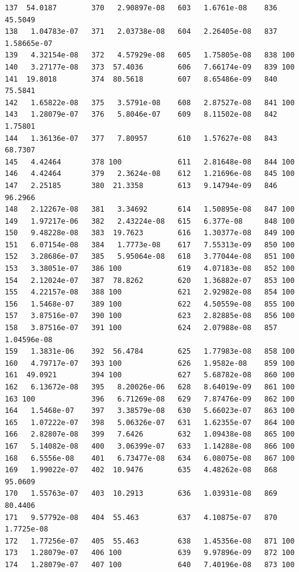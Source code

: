\documentclass{article}
\begin{document}
\begin{verbatim}
137  54.0187        370   2.90897e-08   603   1.6761e-08    836  45.5049
138   1.04783e-07   371   2.03738e-08   604   2.26405e-08   837   1.58665e-07
139   4.32154e-08   372   4.57929e-08   605   1.75805e-08   838 100
140   3.27177e-08   373  57.4036        606   7.66174e-09   839 100
141  19.8018        374  80.5618        607   8.65486e-09   840  75.5841
142   1.65822e-08   375   3.5791e-08    608   2.87527e-08   841 100
143   1.28079e-07   376   5.8046e-07    609   8.11502e-08   842   1.75801
144   1.36136e-07   377   7.80957       610   1.57627e-08   843  68.7307
145   4.42464       378 100             611   2.81648e-08   844 100
146   4.42464       379   2.3624e-08    612   1.21696e-08   845 100
147   2.25185       380  21.3358        613   9.14794e-09   846  96.2966
148   2.12267e-08   381   3.34692       614   1.50895e-08   847 100
149   1.97217e-06   382   2.43224e-08   615   6.377e-08     848 100
150   9.48228e-08   383  19.7623        616   1.30377e-08   849 100
151   6.07154e-08   384   1.7773e-08    617   7.55313e-09   850 100
152   3.28686e-07   385   5.95064e-08   618   3.77044e-08   851 100
153   3.38051e-07   386 100             619   4.07183e-08   852 100
154   2.12024e-07   387  78.8262        620   1.36882e-07   853 100
155   4.22157e-08   388 100             621   2.92982e-08   854 100
156   1.5468e-07    389 100             622   4.50559e-08   855 100
157   3.87516e-07   390 100             623   2.82885e-08   856 100
158   3.87516e-07   391 100             624   2.07988e-08   857   1.04596e-08
159   1.3831e-06    392  56.4784        625   1.77983e-08   858 100
160   4.79717e-07   393 100             626   1.9582e-08    859 100
161  49.0921        394 100             627   5.68782e-08   860 100
162   6.13672e-08   395   8.20026e-06   628   8.64019e-09   861 100
163 100             396   6.71269e-08   629   7.87476e-09   862 100
164   1.5468e-07    397   3.38579e-08   630   5.66023e-07   863 100
165   1.07222e-07   398   5.06326e-07   631   1.62355e-07   864 100
166   2.82807e-08   399   7.6426        632   1.09438e-08   865 100
167   5.14082e-08   400   3.06399e-07   633   1.14288e-08   866 100
168   6.5556e-08    401   6.73477e-08   634   6.08075e-08   867 100
169   1.99022e-07   402  10.9476        635   4.48262e-08   868  95.0609
170   1.55763e-07   403  10.2913        636   1.03931e-08   869  80.4406
171   9.57792e-08   404  55.463         637   4.10875e-07   870   1.7725e-08
172   1.77256e-07   405  55.463         638   1.45356e-08   871 100
173   1.28079e-07   406 100             639   9.97896e-09   872 100
174   1.28079e-07   407 100             640   7.40196e-08   873 100

\end{verbatim}
\end{document}
